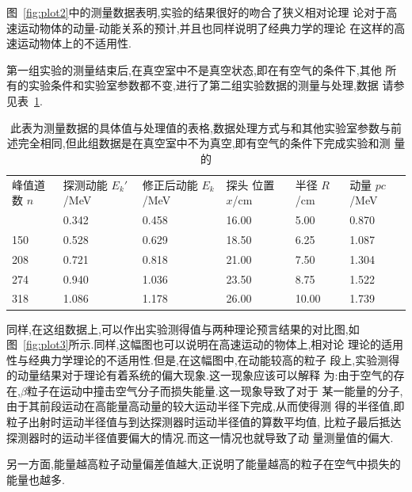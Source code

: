 \documentclass[aps,pre,12pt,preprint,onecolumn,showpacs,showkeys]{revtex4-1}
\begin{document}
图~\ref{fig:plot2}中的测量数据表明,实验的结果很好的吻合了狭义相对论理
论对于高速运动物体的动量-动能关系的预计,并且也同样说明了经典力学的理论
在这样的高速运动物体上的不适用性.


第一组实验的测量结束后,在真空室中不是真空状态,即在有空气的条件下,其他
所有的实验条件和实验室参数都不变,进行了第二组实验数据的测量与处理,数据
请参见表~\ref{tab:table2}.


\begin{table}[htbp]
  \caption{\label{tab:table2}%
此表为测量数据的具体值与处理值的表格,数据处理方式与和其他实验室参数与前
述完全相同,但此组数据是在真空室中不为真空,即有空气的条件下完成实验和测
量的}
\begin{ruledtabular}
  \begin{tabular}{llllll}
     峰值道数 $n$ & 探测动能 $E_k'$/MeV & 修正后动能  $E_k$/MeV & 探头
     位置 $x$/cm & 半径 $R$/cm & 动量 $pc$/MeV\\
     \colrule
94 & 0.342 & 0.458 & 16.00 & 5.00 & 0.870 \\
150 & 0.528 & 0.629 & 18.50 & 6.25 & 1.087 \\
208 & 0.721 & 0.818 & 21.00 & 7.50 & 1.304 \\
274 & 0.940 & 1.036 & 23.50 & 8.75 & 1.522 \\
318 & 1.086 & 1.178 & 26.00 & 10.00 & 1.739
   \end{tabular}
\end{ruledtabular}
\end{table}

同样,在这组数据上,可以作出实验测得值与两种理论预言结果的对比图,如
图~\ref{fig:plot3}所示.同样,这幅图也可以说明在高速运动的物体上,相对论
理论的适用性与经典力学理论的不适用性.但是,在这幅图中,在动能较高的粒子
段上,实验测得的动量结果对于理论有着系统的偏大现象.这一现象应该可以解释
为:由于空气的存在,$\beta$粒子在运动中撞击空气分子而损失能量.这一现象导致了对于
某一能量的分子,由于其前段运动在高能量高动量的较大运动半径下完成,从而使得测
得的半径值,即粒子出射时运动半径值与到达探测器时运动半径值的算数平均值,
比粒子最后抵达探测器时的运动半径值要偏大的情况.而这一情况也就导致了动
量测量值的偏大.

另一方面,能量越高粒子动量偏差值越大,正说明了能量越高的粒子在空气中损失的
能量也越多.
\end{document}
